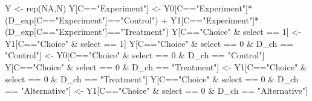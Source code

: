 \documentclass[
]{article}
\newenvironment{Shaded}{\begin{snugshade}}{\end{snugshade}}
\newcommand{\ConstantTok}[1]{\textcolor[rgb]{0.00,0.00,0.00}{#1}}
\newcommand{\DecValTok}[1]{\textcolor[rgb]{0.00,0.00,0.81}{#1}}
\newcommand{\FunctionTok}[1]{\textcolor[rgb]{0.00,0.00,0.00}{#1}}
\newcommand{\NormalTok}[1]{#1}
\newcommand{\OtherTok}[1]{\textcolor[rgb]{0.56,0.35,0.01}{#1}}
\newcommand{\SpecialCharTok}[1]{\textcolor[rgb]{0.00,0.00,0.00}{#1}}
\newcommand{\StringTok}[1]{\textcolor[rgb]{0.31,0.60,0.02}{#1}}
\begin{document}
\begin{Shaded}
\begin{Highlighting}[]
\NormalTok{  Y }\OtherTok{\textless{}{-}} \FunctionTok{rep}\NormalTok{(}\ConstantTok{NA}\NormalTok{,N)}
\NormalTok{  Y[C}\SpecialCharTok{==}\StringTok{"Experiment"}\NormalTok{] }\OtherTok{\textless{}{-}}\NormalTok{ Y0[C}\SpecialCharTok{==}\StringTok{"Experiment"}\NormalTok{]}\SpecialCharTok{*}\NormalTok{(D\_exp[C}\SpecialCharTok{==}\StringTok{"Experiment"}\NormalTok{]}\SpecialCharTok{==}\StringTok{"Control"}\NormalTok{) }\SpecialCharTok{+} 
\NormalTok{    Y1[C}\SpecialCharTok{==}\StringTok{"Experiment"}\NormalTok{]}\SpecialCharTok{*}\NormalTok{(D\_exp[C}\SpecialCharTok{==}\StringTok{"Experiment"}\NormalTok{]}\SpecialCharTok{==}\StringTok{"Treatment"}\NormalTok{)}
\NormalTok{  Y[C}\SpecialCharTok{==}\StringTok{"Choice"} \SpecialCharTok{\&}\NormalTok{ select }\SpecialCharTok{==} \DecValTok{1}\NormalTok{] }\OtherTok{\textless{}{-}}\NormalTok{ Y1[C}\SpecialCharTok{==}\StringTok{"Choice"} \SpecialCharTok{\&}\NormalTok{ select }\SpecialCharTok{==} \DecValTok{1}\NormalTok{]}
\NormalTok{  Y[C}\SpecialCharTok{==}\StringTok{"Choice"} \SpecialCharTok{\&}\NormalTok{ select }\SpecialCharTok{==} \DecValTok{0} \SpecialCharTok{\&}\NormalTok{ D\_ch }\SpecialCharTok{==} \StringTok{"Control"}\NormalTok{] }\OtherTok{\textless{}{-}}\NormalTok{ Y0[C}\SpecialCharTok{==}\StringTok{"Choice"} \SpecialCharTok{\&}\NormalTok{ select }\SpecialCharTok{==} \DecValTok{0} \SpecialCharTok{\&}\NormalTok{ D\_ch }\SpecialCharTok{==} \StringTok{"Control"}\NormalTok{]}
\NormalTok{  Y[C}\SpecialCharTok{==}\StringTok{"Choice"} \SpecialCharTok{\&}\NormalTok{ select }\SpecialCharTok{==} \DecValTok{0} \SpecialCharTok{\&}\NormalTok{ D\_ch }\SpecialCharTok{==} \StringTok{"Treatment"}\NormalTok{] }\OtherTok{\textless{}{-}}\NormalTok{ Y1[C}\SpecialCharTok{==}\StringTok{"Choice"} \SpecialCharTok{\&}\NormalTok{ select }\SpecialCharTok{==} \DecValTok{0} \SpecialCharTok{\&}\NormalTok{ D\_ch }\SpecialCharTok{==} \StringTok{"Treatment"}\NormalTok{]}
\NormalTok{  Y[C}\SpecialCharTok{==}\StringTok{"Choice"} \SpecialCharTok{\&}\NormalTok{ select }\SpecialCharTok{==} \DecValTok{0} \SpecialCharTok{\&}\NormalTok{ D\_ch }\SpecialCharTok{==} \StringTok{"Alternative"}\NormalTok{] }\OtherTok{\textless{}{-}}\NormalTok{ Y1[C}\SpecialCharTok{==}\StringTok{"Choice"} \SpecialCharTok{\&}\NormalTok{ select }\SpecialCharTok{==} \DecValTok{0} \SpecialCharTok{\&}\NormalTok{ D\_ch }\SpecialCharTok{==} \StringTok{"Alternative"}\NormalTok{]}
  

\end{Highlighting}
\end{Shaded}
\end{document}
